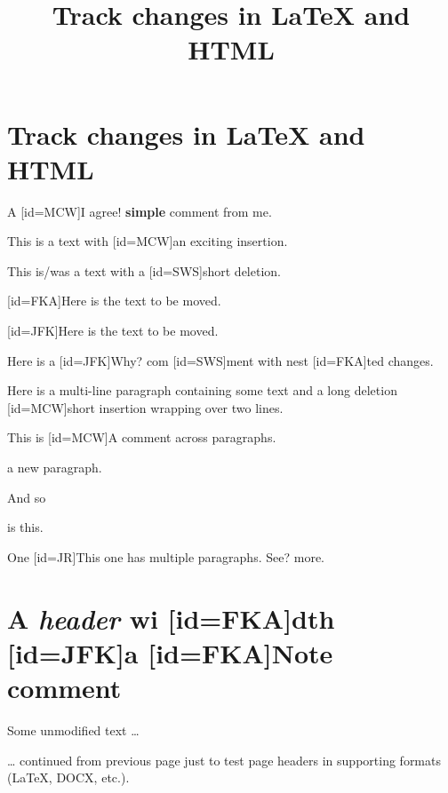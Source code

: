 \documentclass[]{article}
\title{Track changes in LaTeX and HTML}
\date{}
\makeatletter
\newcommand{\note}[2][]{\added[#1,remark={#2}]{}}
\newcommand\hlnotesingle{%
  \bgroup
  \expandafter\def\csname sout\space\endcsname{\bgroup \ULdepth =-.8ex \ULset}%
  \markoverwith{\textcolor{yellow}{\rule[-.5ex]{.1pt}{2.5ex}}}%
  \ULon}
\newcommand\hlnote[1]{\let\helpcmd\hlnotesingle\parhelp#1\par\relax\relax}
\newcommand\ifmoving{%
  \ifx\protect\@unexpandable@protect
      \expandafter\@firstoftwo
  \else
      \expandafter\@secondoftwo
  \fi
}
\newcommand{\gobbletwo}[2][]{\@bsphack\@esphack}
\newcommand{\gobbleone}[1][]{\@bsphack\@esphack}
\let\oldadded\added
\let\olddeleted\deleted
\let\oldhlnote\hlnote
\let\oldnote\note
\renewcommand{\added}{\ifmoving{\gobbleone}{\oldadded}}
\renewcommand{\deleted}{\ifmoving{\gobbletwo}{\olddeleted}}
\renewcommand{\hlnote}{\ifmoving{}{\oldhlnote}}
\renewcommand{\note}{\ifmoving{\gobbletwo}{\oldnote}}
\makeatother
\begin{document}
\maketitle

{
\setcounter{tocdepth}{3}
\tableofcontents
}
\hypertarget{track-changes-in-latex-and-html}{%
\section{Track changes in LaTeX and HTML}\label{track-changes-in-latex-and-html}}

A \note[id=MCW]{I agree!}\hlnote{\textbf{simple}} comment from me.

This is a text with \added[id=MCW]{an exciting} insertion.

This is/was a text with a \deleted[id=SWS]{short} deletion.

\added[id=FKA]{Here is the text to be moved.}

\deleted[id=JFK]{Here is the text to be moved.}

Here is a \note[id=JFK]{Why?}\hlnote{com\added[id=SWS]{m}ent with nest\deleted[id=FKA]{t}ed changes}.

Here is a multi-line paragraph containing some text and a long deletion \deleted[id=MCW]{short insertion} wrapping over two lines.

This is \note[id=MCW]{A comment across paragraphs.}\hlnote{a new paragraph.

And so} is this.

One \note[id=JR]{This one has multiple paragraphs. \newline \newline See?}\hlnote{more}.

\hypertarget{a-header-width-a-notecomment}{%
\section{\texorpdfstring{A \emph{header} wi\deleted[id=FKA]{d}th \added[id=JFK]{a} \note[id=FKA]{Note}\hlnote{comment}}{A header with  comment}}\label{a-header-width-a-notecomment}}

Some unmodified text \ldots{}

\newpage

\ldots{} continued from previous page just to test page headers in supporting formats (LaTeX, DOCX, etc.).
\end{document}
